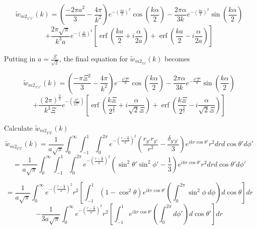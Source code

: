 \documentclass[double,12pt]{beavtex}
\begin{document}
\begin{displaymath}{\widetilde{w}_{{m2}_{x'x'}}(k)=\left(\frac{-2\pi{a}^2}{3}-\frac{4\pi}{k^2}\right)e^{-\left(\frac{ka}{2}\right)^2}\cos(\frac{k\alpha}{2})-\frac{2\pi\alpha}{3k}e^{-\left(\frac{ka}{2}\right)^2}\sin(\frac{k\alpha}{2})}\end{displaymath} 
\begin{equation}{+\frac{2\pi\sqrt{\pi}}{k^3a}e^{-\left(\frac{\alpha}{2a}\right)^2}\left[\operatorname{erf}\left(\frac{ka}{2}+i\frac{\alpha}{2a}\right)+\operatorname{erf}\left(\frac{ka}{2}-i\frac{\alpha}{2a}\right)\right]}\end{equation} 

Putting in $a=\frac{\Xi}{\sqrt{2}}$, the final equation for $\widetilde{w}_{{m2}_{xx}}(k)$ becomes

\begin{equation}{\widetilde{w}_{{m2}_{x'x'}}(k)=\left(\frac{-\pi{\Xi}^2}{3}-\frac{4\pi}{k^2}\right)e^{-\frac{k^2\Xi^2}{8}}\cos(\frac{k\alpha}{2})-\frac{2\pi\alpha}{3k}e^{-\frac{k^2\Xi^2}{8}}\sin(\frac{k\alpha}{2})}\nonumber\end{equation} 
\begin{equation}{+\frac{{(2\pi)}^{\frac{3}{2}}}{k^3\Xi}e^{-\left(\frac{\alpha^2}{2\Xi^2}\right)}\left[\operatorname{erf}\left(\frac{k\Xi}{2^\frac{3}{2}}+i\frac{\alpha}{\sqrt{2}\Xi}\right)+\operatorname{erf}\left(\frac{k\Xi}{2^\frac{3}{2}}-i\frac{\alpha}{\sqrt{2}\Xi}\right)\right]}\end{equation} 


Calculate $\widetilde{w}_{{m2}_{y'y'}}(k)$ 
\begin{equation}{\widetilde{w}_{{m2}_{y'y'}}(k)=\frac{1}{a\sqrt{\pi}}\int_{0}^{\infty}\int_{-1}^{1}\int_{0}^{2\pi}e^{-\left(\frac{r-\frac{\alpha}{2}}{a}\right)^2}\left(\frac{r_{y'}r_{y'}}{r^2}-\frac{\delta_{y'y'}}{3}\right)e^{ikr\cos\theta'}r^2d{r}d{\cos\theta'}d{\phi'}}\end{equation}
\begin{equation}{=\frac{1}{a\sqrt{\pi}}\int_{0}^{\infty}\int_{-1}^{1}\int_{0}^{2\pi}e^{-\left(\frac{r-\frac{\alpha}{2}}{a}\right)^2}\left(\sin^2\theta'\sin^2\phi'-\frac{1}{3}\right)e^{ikr\cos\theta'}r^2d{r}d{\cos\theta'}d{\phi'}}\end{equation}

\begin{displaymath}{=\frac{1}{a\sqrt{\pi}}\int_{0}^{\infty}e^{-\left(\frac{r-\frac{\alpha}{2}}{a}\right)^2}r^2\left[\int_{-1}^{1}\left(1-\cos^2\theta\right)e^{ikr\cos\theta'}\left(\int_{0}^{2\pi}\sin^2\phi~d{\phi}\right)d{\cos\theta}\right]d{r}}\end{displaymath} 
\begin{equation}{-\frac{1}{3a\sqrt{\pi}}\int_{0}^{\infty}e^{-\left(\frac{r-\frac{\alpha}{2}}{a}\right)^2}r^2\left[\int_{-1}^{1}e^{ikr\cos\theta'}\left(\int_{0}^{2\pi}d{\phi'}\right)d{\cos\theta'}\right]d{r}}\end{equation}
\end{document}
